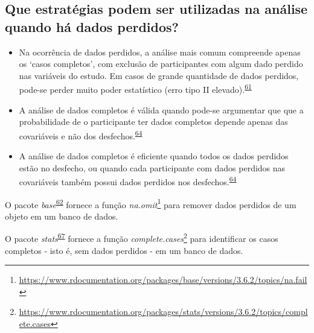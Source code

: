 \documentclass[
  a4paper,
]{book}
\renewcommand{\href}[2]{#2\footnote{\url{#1}}}
\newenvironment{infobox}[1]
  {
  \begin{itemize}
  \renewcommand{\labelitemi}{
    \raisebox{-.7\height}[0pt][0pt]{
      {\setkeys{Gin}{width=3em,keepaspectratio}
        \texttt{[image: \#1]}}
    }
  }
  \setlength{\fboxsep}{1em}
  \begin{blackbox}
  \item
  }
  {
  \end{blackbox}
  \end{itemize}
  }
\begin{document}
\hypertarget{que-estratuxe9gias-podem-ser-utilizadas-na-anuxe1lise-quando-huxe1-dados-perdidos}{%
\subsection{Que estratégias podem ser utilizadas na análise quando há dados perdidos?}\label{que-estratuxe9gias-podem-ser-utilizadas-na-anuxe1lise-quando-huxe1-dados-perdidos}}

\begin{itemize}
\item
  Na ocorrência de dados perdidos, a análise mais comum compreende apenas os `casos completos', com exclusão de participantes com algum dado perdido nas variáveis do estudo. Em casos de grande quantidade de dados perdidos, pode-se perder muito poder estatístico (erro tipo II elevado).\textsuperscript{\protect\hyperlink{ref-Altman2007}{61}}
\item
  A análise de dados completos é válida quando pode-se argumentar que que a probabilidade de o participante ter dados completos depende apenas das covariáveis e não dos desfechos.\textsuperscript{\protect\hyperlink{ref-carpenter2021}{64}}
\item
  A análise de dados completos é eficiente quando todos os dados perdidos estão no desfecho, ou quando cada participante com dados perdidos nas covariáveis também possui dados perdidos nos desfechos.\textsuperscript{\protect\hyperlink{ref-carpenter2021}{64}}
\end{itemize}

\begin{infobox}{images/Rlogo}
O pacote \emph{base}\textsuperscript{\protect\hyperlink{ref-base-2}{62}} fornece a função \href{https://www.rdocumentation.org/packages/base/versions/3.6.2/topics/na.fail}{\emph{na.omit}} para remover dados perdidos de um objeto em um banco de dados.

\end{infobox}

\begin{infobox}{images/Rlogo}
O pacote \emph{stats}\textsuperscript{\protect\hyperlink{ref-stats}{67}} fornece a função \href{https://www.rdocumentation.org/packages/stats/versions/3.6.2/topics/complete.cases}{\emph{complete.cases}} para identificar os casos completos - isto é, sem dados perdidos - em um banco de dados.

\end{infobox}
\end{document}
